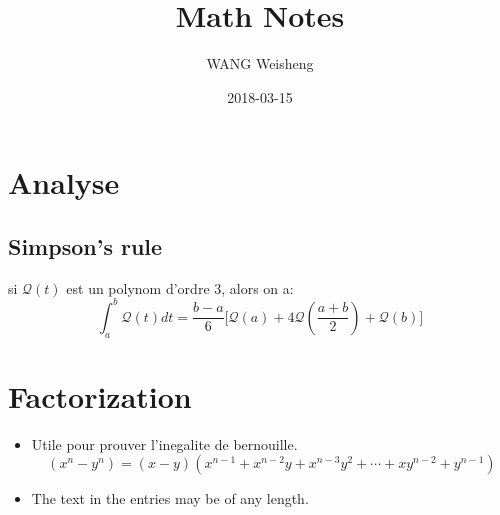 \documentclass[a4paper]{article}
\title{Math Notes}
\date{2018-03-15}
\author{WANG Weisheng}
\begin{document}
\maketitle
\newpage

\section{Analyse}
\subsection{Simpson's rule}
si $\mathcal{Q}(t)$ est un polynom d'ordre 3, alors on a:
\begin{equation}
\int_{a}^{b}\mathcal{Q}(t)dt=\frac{b-a}{6}\big[\mathcal{Q}(a)+4\mathcal{Q}(\frac{a+b}{2})+\mathcal{Q}(b)\big]
\end{equation}

\section{Factorization}
\begin{itemize}
  \item Utile pour prouver l'inegalite de bernouille.
  \begin{equation}
  (x^n-y^n)=(x-y)(x^{n-1}+x^{n-2}y+x^{n-3}y^{2}+\cdots+xy^{n-2}+y^{n-1})
  \end{equation}

  \item The text in the entries may be of any length.
\end{itemize}
\end{document}
